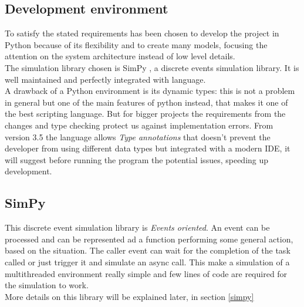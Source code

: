 \subsection{Development environment}
To satisfy the stated requirements has been chosen to develop the project in Python
because of its flexibility and to create many models, focusing the attention on the
system architecture instead of low level details. \\
The simulation library chosen is SimPy \cite{simpy}, a discrete events
simulation library. It is well maintained and perfectly integrated with
language. \\
A drawback of a Python environment is its dynamic types: this is not a problem
in general but one of the main features of python instead, that makes it one of
the best scripting language. But for bigger projects the requirements from the
changes and type checking protect us against implementation errors. From version
3.5 the language allows \textit{Type annotations} that doesn't prevent the
developer from using different data types but integrated with a modern IDE, it
will suggest before running the program the potential issues, speeding up
development.

\subsection{SimPy}
This discrete event simulation library is \textit{Events oriented}. An event can
be processed and can be represented ad a function performing some general
action, based on the situation. The caller event can wait for the completion of
the task called or just trigger it and simulate an async call. This make a
simulation of a multithreaded environment really simple and few lines of code
are required for the simulation to work. \\
More details on this library will be explained later, in section \ref{simpy}

